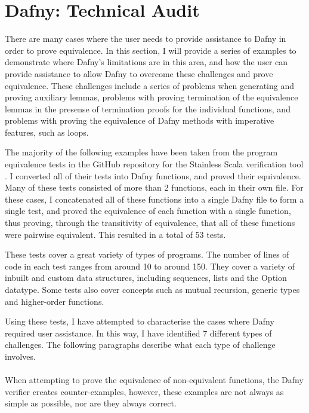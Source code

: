 \section{Dafny: Technical Audit}\label{sec:audit}

There are many cases where the user needs to provide assistance to Dafny in order to prove equivalence. In this section, I will provide a series of examples to demonstrate where Dafny's limitations are in this area, and how the user can provide assistance to allow Dafny to overcome these challenges and prove equivalence. These challenges include a series of problems when generating and proving auxiliary lemmas, problems with proving termination of the equivalence lemmas in the presense of termination proofs for the individual functions, and problems with proving the equivalence of Dafny methods with imperative features, such as loops.

The majority of the following examples have been taken from the program equivalence tests in the GitHub repository for the Stainless Scala verification tool \parencite{StainlessFrontendsBenchmarks}. I converted all of their tests into Dafny functions, and proved their equivalence. Many of these tests consisted of more than 2 functions, each in their own file. For these cases, I concatenated all of these functions into a single Dafny file to form a single test, and proved the equivalence of each function with a single function, thus proving, through the transitivity of equivalence, that all of these functions were pairwise equivalent. This resulted in a total of 53 tests.

These tests cover a great variety of types of programs. The number of lines of code in each test ranges from around 10 to around 150. They cover a variety of inbuilt and custom data structures, including sequences, lists and the Option datatype. Some tests also cover concepts such as mutual recursion, generic types and higher-order functions.

Using these tests, I have attempted to characterise the cases where Dafny required user assistance. In this way, I have identified 7 different types of challenges. The following paragraphs describe what each type of challenge involves.

\paragraph{} When attempting to prove the equivalence of non-equivalent functions, the Dafny verifier creates counter-examples, however, these examples are not always as simple as possible, nor are they always correct.
